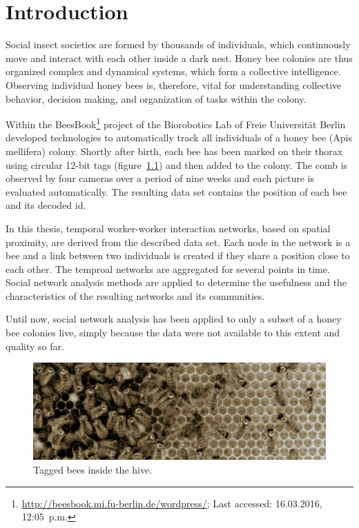\chapter{Introduction}
\label{ch:intro}

Social insect societies are formed by thousands of individuals, which continuously move and interact with each other inside a dark nest. Honey bee colonies are thus organized complex and dynamical systems, which form a collective intelligence. Observing individual honey bees is, therefore, vital for understanding collective behavior, decision making, and organization of tasks within the colony.

Within the BeesBook\footnote{\url{http://beesbook.mi.fu-berlin.de/wordpress/}; Last accessed: 16.03.2016, 12:05~p.m.} project of the Biorobotics Lab of Freie Universität Berlin~\textcite{wario2015automatic} developed technologies to automatically track all individuals of a honey bee (Apis mellifera) colony. Shortly after birth, each bee has been marked on their thorax using circular 12-bit tags (figure~\ref{fig:markers}) and then added to the colony. The comb is observed by four cameras over a period of nine weeks and each picture is evaluated automatically. The resulting data set contains the position of each bee and its decoded id.

In this thesis, temporal worker-worker interaction networks, based on spatial proximity, are derived from the described data set. Each node in the network is a bee and a link between two individuals is created if they share a position close to each other. The temproal networks are aggregated for several points in time.  Social network analysis methods are applied to determine the usefulness and the characteristics of the resulting networks and its communities.

Until now, social network analysis has been applied to only a subset of a honey bee colonies live, simply because the data were not available to this extent and quality so far.

\begin{figure}[htb]
	\centering
	\includegraphics[width=1.0\textwidth]{Figures/markers}
	\caption{Tagged bees inside the hive.}
	\label{fig:markers}
\end{figure}

